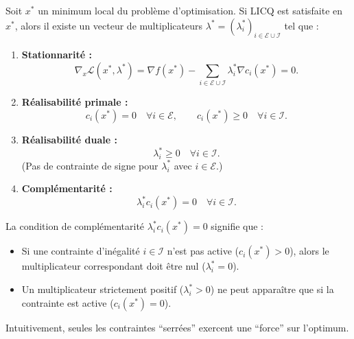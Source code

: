 \begin{theoreme}
    Soit $x^*$ un minimum local du problème d'optimisation. Si LICQ est satisfaite en $x^*$, alors il existe un vecteur de multiplicateurs $\lambda^* = (\lambda_i^*)_{i \in \mathcal{E} \cup \mathcal{I}}$ tel que :
    \begin{enumerate}
        \item \textbf{Stationnarité :} 
        \begin{equation}
            \nabla_x \mathcal{L}(x^*, \lambda^*) = \nabla f(x^*) - \sum_{i \in \mathcal{E} \cup \mathcal{I}} \lambda_i^* \nabla c_i(x^*) = 0.
        \end{equation}
        
        \item \textbf{Réalisabilité primale :}
        \begin{equation}
            c_i(x^*) = 0 \quad \forall i \in \mathcal{E}, \qquad c_i(x^*) \geq 0 \quad \forall i \in \mathcal{I}.
        \end{equation}
        
        \item \textbf{Réalisabilité duale :}
        \begin{equation}
            \lambda_i^* \geq 0 \quad \forall i \in \mathcal{I}.
        \end{equation}
        (Pas de contrainte de signe pour $\lambda_i^*$ avec $i \in \mathcal{E}$.)
        
        \item \textbf{Complémentarité :}
        \begin{equation}
            \lambda_i^* c_i(x^*) = 0 \quad \forall i \in \mathcal{I}.
        \end{equation}
    \end{enumerate}
\end{theoreme}

\begin{remarque}
    La condition de complémentarité $\lambda_i^* c_i(x^*) = 0$ signifie que :
    \begin{itemize}
        \item Si une contrainte d'inégalité $i \in \mathcal{I}$ n'est pas active ($c_i(x^*) > 0$), alors le multiplicateur correspondant doit être nul ($\lambda_i^* = 0$).
        \item Un multiplicateur strictement positif ($\lambda_i^* > 0$) ne peut apparaître que si la contrainte est active ($c_i(x^*) = 0$).
    \end{itemize}
    Intuitivement, seules les contraintes ``serrées'' exercent une ``force'' sur l'optimum.
\end{remarque}

